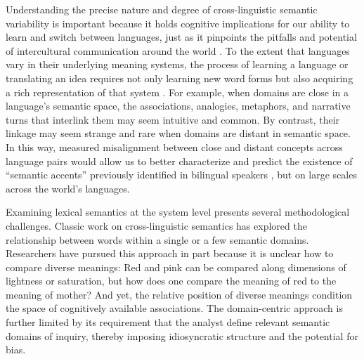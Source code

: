 \documentclass[9pt,twocolumn,twoside,lineno]{pnas-new}
\begin{document}
Understanding the precise nature and degree of cross-linguistic semantic variability is important because it holds cognitive implications for our ability to learn and switch between languages, just as it pinpoints the pitfalls and potential of intercultural communication around the world \cite{marti2023latent}. To the extent that languages vary in their underlying meaning systems, the process of learning a language or translating an idea requires not only learning new word forms but also acquiring a rich representation of that system \cite{Lupyan_undated-du}. For example, when domains are close in a language's semantic space, the associations, analogies, metaphors, and narrative turns that interlink them may seem intuitive and common. By contrast, their linkage may seem strange and rare when domains are distant in semantic space. In this way, measured misalignment between close and distant concepts across language pairs would allow us to better characterize and predict the existence of ``semantic accents'' previously identified in bilingual speakers \cite{matsuki2021understanding, dong2005shared}, but on large scales across the world's languages. 

Examining lexical semantics at the system level presents several methodological challenges. Classic work on cross-linguistic semantics has explored the relationship between words within a single \cite[e.g.,][]{berlin1991basic,regier2007color,baddeley2009} or a few \cite{thompson2020cultural,xu2020conceptual, majid2015semantic} semantic domains. Researchers have pursued this approach in part because it is unclear how to compare diverse meanings: Red and pink can be compared along dimensions of lightness or saturation, but how does one compare the meaning of red to the meaning of mother? And yet, the relative position of diverse meanings condition the space of cognitively available associations. The domain-centric approach is further limited by its requirement that the analyst define relevant semantic domains of inquiry, thereby imposing idiosyncratic structure and the potential for bias.
\end{document}

